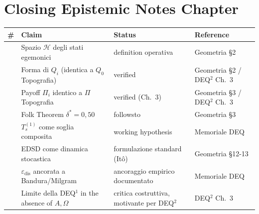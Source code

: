 \section{Closing Epistemic Notes
Chapter}\label{note-epistemiche-di-chiusura-chapter}

{\def\LTcaptype{none} %
{\small\begin{longtable}[]{@{}
  >{\raggedright\arraybackslash}p{}
  >{\raggedright\arraybackslash}p{}
  >{\raggedright\arraybackslash}p{}
  >{\raggedright\arraybackslash}p{}@{}}
\toprule\noalign{}
\begin{minipage}[b]{\linewidth}\raggedright
\#
\end{minipage} & \begin{minipage}[b]{\linewidth}\raggedright
Claim
\end{minipage} & \begin{minipage}[b]{\linewidth}\raggedright
Status
\end{minipage} & \begin{minipage}[b]{\linewidth}\raggedright
Reference
\end{minipage} \\
\midrule\noalign{}
\endhead
\bottomrule\noalign{}
\endlastfoot
1 & Spazio \(\mathcal{H}\) degli stati egemonici & \Proved{} definition
operativa & Geometria \S{}2 \\
2 & Forma di \(Q_i\) (identica a \(Q_0\) Topografia) & \Proved{}
verified & Geometria \S{}2 / DEQ$^2$ Ch.~3 \\
3 & Payoff \(\Pi_i\) identico a $\Pi$ Topografia & \Proved{} verified
(Ch.~3) & Geometria \S{}3 / DEQ$^2$ Ch.~3 \\
4 & Folk Theorem \(\delta^* = 0{,}50\) & \Proved{} followsto & Geometria
\S{}3 \\
5 & \(T_s^{(1)}\) come soglia composita & \Hypoth{} working hypothesis &
Memoriale DEQ \\
6 & EDSD come dinamica stocastica & \Proved{} formulazione standard
(Itô) & Geometria \S{}12-13 \\
7 & \(\varepsilon_{\text{dis}}\) ancorata a Bandura/Milgram & \Proved{}
ancoraggio empirico documentato & Memoriale DEQ \\
8 & Limite della DEQ$^1$ in the absence of \(A, \Omega\) & \Conj{} critica
costruttiva, motivante per DEQ$^2$ & DEQ$^2$ Ch.~3 \\
\end{longtable}}
}


